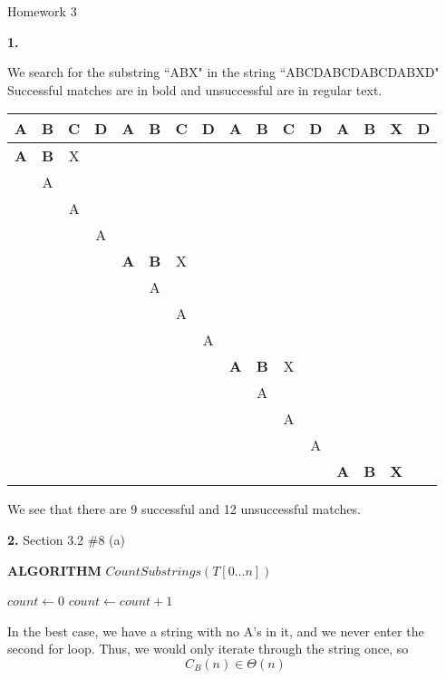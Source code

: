 \documentclass[letterpaper, 11pt]{article}
\newcommand{\hwnumber}[1]{\medskip \noindent\textbf{#1.} \smallskip}
\newcommand{\hwnumbersec}[3]{\medskip \noindent\textbf{#1.} Section #2 \##3 \smallskip}
\newcommand{\Alg}[1]{\medskip \noindent\textbf{ALGORITHM} \( #1 \)}
\newcommand{\To}{\textbf{ to }}
\begin{document}
\begin{center}
	{\LARGE Homework 3}\\
\end{center}

\hwnumber{1}

We search for the substring ``ABX" in the string
``ABCDABCDABCDABXD" Successful matches are in bold and unsuccessful are in
regular text. 

\begin{center}
  \begin{tabular}{cccccccccccccccc}
    A & B & C & D & A & B & C & D & A & B & C & D & A & B & X & D \\
    \hline
    \textbf{A} & \textbf{B} & X \\
               & A \\
               & & A \\
               & & & A \\
               & & & & \textbf{A} & \textbf{B} & X \\
               & & & & & A \\
               & & & & & & A \\
               & & & & & & & A \\
               & & & & & & & & \textbf{A} & \textbf{B} & X \\
               & & & & & & & & & A \\
               & & & & & & & & & & A \\
               & & & & & & & & & & & A \\
               & & & & & & & & & & & & \textbf{A} & \textbf{B} & \textbf{X} \\
  \end{tabular}
\end{center}

We see that there are 9 successful and 12 unsuccessful matches. 

\hwnumbersec{2}{3.2}{8 (a)}

\Alg{CountSubstrings(T[0 \dots n])}
\begin{algorithmic}
  \State \(count \gets 0\)
  \For{\(i \gets 0 \To n - 1\)}
      \For{\(j \gets i \To n\)} 
          \(count \gets count + 1\)
        \EndIf
      \EndFor
    \EndIf
  \EndFor
\end{algorithmic}

\medskip

In the best case, we have a string with no A's in it, and we never
enter the second for loop. Thus, we would only iterate through the string
once, so 
\[C_B(n) \in \Theta(n) \]
\end{document}

